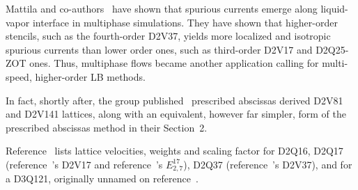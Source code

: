     Mattila  and  co-authors~\cite{2013-MattilaKK+PhilippiPC-IntJModPhysC}  have  shown  that  spurious  currents  emerge  along
    liquid-vapor interface in multiphase simulations. They have shown that  higher-order  stencils,  such  as  the  fourth-order
    D2V37, yields more localized and isotropic spurious currents than lower order ones, such as third-order D2V17 and  D2Q25-ZOT
    ones. Thus, multiphase flows became another application calling for multi-speed, higher-order LB methods.

    In fact, shortly after, the group published~\cite{2014-MattilaKK+PhilippiPC-SciWorldJ} prescribed  abscissas  derived  D2V81
    and D2V141 lattices, along with an equivalent, however far simpler,  form  of  the  prescribed  abscissas  method  in  their
    Section~2.

    Reference~\cite{2014-MengJ+ZhangY-JComputPhys} lists lattice  velocities,  weights  and  scaling  factor  for  D2Q16,  D2Q17
    (reference~\cite{2007-SiebertDN+PhilippiPC-IntJModPhysC}'s D2V17 and reference~\cite{2010-ShanX-PhysRevE}'s $E_{2,7}^{17}$),
    D2Q37   (reference~\cite{2006-PhilippiPC+SurmasR-PhysRevE}'s   D2V37),   and   for   a   D3Q121,   originally   unnamed   on
    reference~\cite{2008-NieX+ChenH-PhysRevE}.







